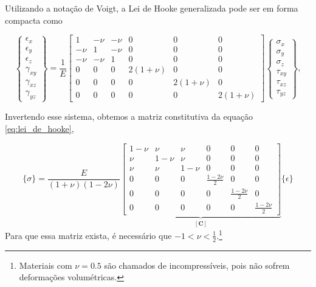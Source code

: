 Utilizando a notação de Voigt, a Lei de Hooke generalizada pode ser em forma compacta como

\begin{equation}
    \begin{Bmatrix}
        \epsilon_x \\
        \epsilon_y \\
        \epsilon_z \\
        \gamma_{xy} \\
        \gamma_{xz} \\
        \gamma_{yz}
    \end{Bmatrix}
    =
    \frac{1}{E}
    \begin{bmatrix}
        1 & -\nu & -\nu & 0 & 0 & 0 \\
        -\nu & 1 & -\nu & 0 & 0 & 0 \\
        -\nu & -\nu & 1 & 0 & 0 & 0 \\
        0 & 0 & 0 & 2(1+\nu) & 0 & 0 \\
        0 & 0 & 0 & 0 & 2(1+\nu) & 0 \\
        0 & 0 & 0 & 0 & 0 & 2(1+\nu)
    \end{bmatrix}
    \begin{Bmatrix}
        \sigma_x \\
        \sigma_y \\
        \sigma_z \\
        \tau_{xy} \\
        \tau_{xz} \\
        \tau_{yz}
    \end{Bmatrix},
    \label{eq:lei_de_hooke_generalizada_matricial}
\end{equation}

Invertendo esse sistema, obtemos a matriz constitutiva da equação \ref{eq:lei_de_hooke},

\begin{equation}
    \{\sigma\} = \frac{E}{(1+\nu)(1-2\nu)}
    \underbrace{\begin{bmatrix} 1-\nu & \nu & \nu & 0 & 0 & 0 \\
        \nu & 1-\nu & \nu & 0 & 0 & 0 \\
        \nu & \nu & 1-\nu & 0 & 0 & 0 \\
        0 & 0 & 0 & \frac{1-2\nu}{2} & 0 & 0 \\
        0 & 0 & 0 & 0 & \frac{1-2\nu}{2} & 0 \\
        0 & 0 & 0 & 0 & 0 & \frac{1-2\nu}{2} 
    \end{bmatrix}}_{[\bm{C}]}
    \{\epsilon\}
\end{equation}
Para que essa matriz exista, é necessário que $-1 < \nu < \frac{1}{2}$.\footnote{Materiais com $\nu = 0.5$ são chamados de incompressíveis, pois não sofrem deformações volumétricas.}

